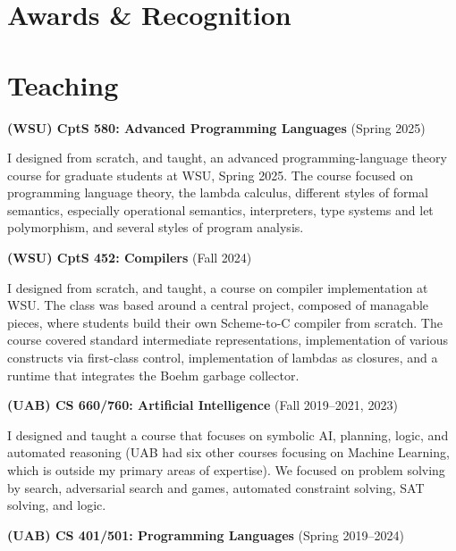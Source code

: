 \documentclass[line]{res}
\begin{document}
\begin{resume}
   
\section{\large Awards \& Recognition} \vspace{0.2in}


    
\section{\large Teaching} \vspace{0.2in}
    
\textbf{(WSU) CptS 580: Advanced Programming Languages} (Spring 2025)

I designed from scratch, and taught, an advanced programming-language theory course for graduate students at WSU, Spring 2025. The course focused on programming language theory, the lambda calculus, different styles of formal semantics, especially operational semantics, interpreters, type systems and let polymorphism, and several styles of program analysis.
    
\textbf{(WSU) CptS 452: Compilers} (Fall 2024)

I designed from scratch, and taught, a course on compiler implementation at WSU. The class was based around a central project, composed of managable pieces, where students build their own Scheme-to-C compiler from scratch. The course covered standard intermediate representations, implementation of various constructs via first-class control, implementation of lambdas as closures, and a runtime that integrates the Boehm garbage collector. 

\textbf{(UAB) CS 660/760: Artificial Intelligence} (Fall 2019--2021, 2023)

I designed and taught a course that focuses on symbolic AI, planning, logic, and automated reasoning (UAB had six other courses focusing on Machine Learning, which is outside my primary areas of expertise). We focused on problem solving by search, adversarial search and games, automated constraint solving, SAT solving, and logic. %

\textbf{(UAB) CS 401/501: Programming Languages} (Spring 2019--2024)


\end{resume}
\end{document}

